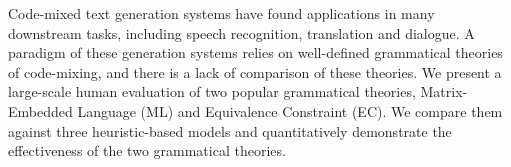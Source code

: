 Code-mixed text generation systems have found applications in many downstream tasks, including speech recognition, translation and dialogue. A paradigm of these generation systems relies on well-defined grammatical theories of code-mixing, and there is a lack of comparison of these theories. We present a large-scale human evaluation of two popular grammatical theories, Matrix-Embedded Language (ML) and Equivalence Constraint (EC). We compare them against three heuristic-based models and quantitatively demonstrate the effectiveness of the two grammatical theories.
